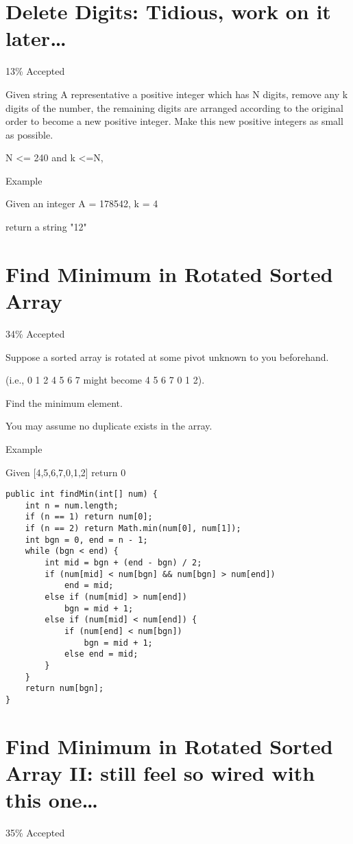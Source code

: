 \documentclass[9pt, b5paaper]{book}
\begin{document}
\section{Delete Digits: Tidious, work on it later\ldots{}}
\label{sec-1-27}

13\% Accepted

Given string A representative a positive integer which has N digits, remove any k digits of the number, the remaining digits are arranged according to the original order to become a new positive integer. Make this new positive integers as small as possible.

N <= 240 and k <=N, 

Example

Given an integer A = 178542, k = 4

return a string "12"
\section{Find Minimum in Rotated Sorted Array}
\label{sec-1-28}

34\% Accepted

Suppose a sorted array is rotated at some pivot unknown to you beforehand.

(i.e., 0 1 2 4 5 6 7 might become 4 5 6 7 0 1 2).

Find the minimum element.

You may assume no duplicate exists in the array.

Example

Given [4,5,6,7,0,1,2] return 0
\begin{verbatim}
public int findMin(int[] num) {
    int n = num.length;
    if (n == 1) return num[0];
    if (n == 2) return Math.min(num[0], num[1]);
    int bgn = 0, end = n - 1;
    while (bgn < end) {
        int mid = bgn + (end - bgn) / 2;
        if (num[mid] < num[bgn] && num[bgn] > num[end])
            end = mid;
        else if (num[mid] > num[end])
            bgn = mid + 1;
        else if (num[mid] < num[end]) {
            if (num[end] < num[bgn])
                bgn = mid + 1;
            else end = mid;
        }  
    }
    return num[bgn];
}
\end{verbatim}
\section{Find Minimum in Rotated Sorted Array II: still feel so wired with this one\ldots{}}
\label{sec-1-29}

35\% Accepted
\end{document}
